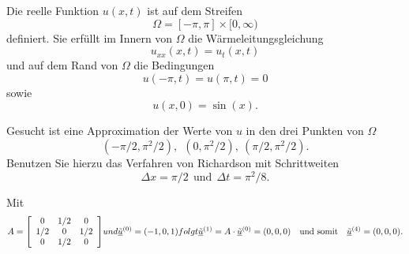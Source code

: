 Die reelle Funktion $u(x,t)$ ist auf dem Streifen $$\Omega = [-\pi, \pi] \times [0,\infty)$$ definiert. Sie erfüllt im Innern von $\Omega$ die Wärmeleitungsgleichung $$u_{xx}(x,t) = u_{t}(x,t)$$ und auf dem Rand von $\Omega$ die Bedingungen $$u(- \pi,t) = u(\pi ,t) = 0$$ sowie $$u(x,0) = \sin(x).$$ 

\vspace{1mm}

Gesucht ist eine Approximation der Werte von $u$ in den drei Punkten von $\Omega$ $$(-\pi/2,\pi^2/2), \ \  (0,\pi^2/2), \ (\pi/2,\pi^2/2).$$ Benutzen Sie hierzu das Verfahren von Richardson mit Schrittweiten $$\Delta x = \pi/2 \ \ \mbox{und} \ \  \Delta t = \pi^2/8.$$

\begin{loesung}
Mit
\[
A = \left[\begin{array}{ccc} 
0 & 1/2 & 0 \\
1/2 & 0 & 1/2 \\ 0 & 1/2 & 0 \end{array}\right]$$ und $$\underline{\tilde u}^{(0)} = (-1, 0, 1)$$ folgt $$\underline{\tilde u}^{(1)} =  A \cdot \underline{\tilde u}^{(0)} = (0, 0, 0) \ \ \ \mbox{und somit} \ \ \ \underline{\tilde u}^{(4)} = (0, 0, 0).
\]
\end{loesung}

